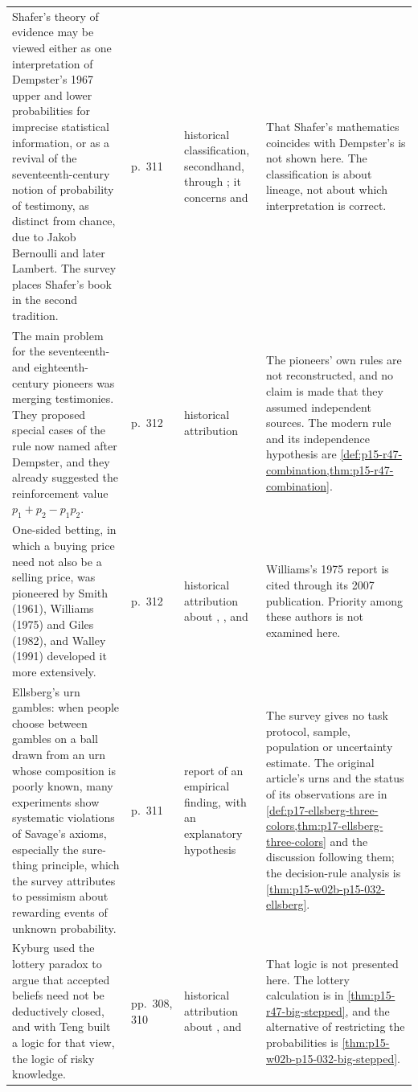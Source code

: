 \begin{longtable}{@{}p{.25\linewidth}p{.08\linewidth}p{.19\linewidth}p{.38\linewidth}@{}}
Shafer's theory of evidence may be viewed either as one interpretation of
Dempster's 1967 upper and lower probabilities for imprecise statistical
information, or as a revival of the seventeenth-century notion of
probability of testimony, as distinct from chance, due to Jakob Bernoulli
and later Lambert. The survey places Shafer's book in the second tradition.
& p.~311 & historical classification, secondhand, through
\cite{R47Shafer1978}; it concerns \cite{R47Dempster1967} and
\cite{R47Shafer1976} &
That Shafer's mathematics coincides with Dempster's is not shown here. The
classification is about lineage, not about which interpretation is correct. \\
The main problem for the seventeenth- and eighteenth-century pioneers was
merging testimonies. They proposed special cases of the rule now named
after Dempster, and they already suggested the reinforcement value
\(p_1+p_2-p_1p_2\). & p.~312 & historical attribution & The pioneers' own
rules are not reconstructed, and no claim is made that they assumed
independent sources. The modern rule and its independence hypothesis are
\cref{def:p15-r47-combination,thm:p15-r47-combination}. \\
One-sided betting, in which a buying price need not also be a selling
price, was pioneered by Smith (1961), Williams (1975) and Giles (1982), and
Walley (1991) developed it more extensively. & p.~312 & historical attribution
about \cite{R47Smith1961}, \cite{R47Williams2007}, \cite{R47Giles1982} and
\cite{R47Walley1991} & Williams's 1975 report is cited through its 2007
publication. Priority among these authors is not examined here. \\
Ellsberg's urn gambles: when people choose between gambles on a ball drawn
from an urn whose composition is poorly known, many experiments show
systematic violations of Savage's axioms, especially the sure-thing
principle, which the survey attributes to pessimism about rewarding
events of unknown probability. & p.~311 & report of an empirical
finding, with an explanatory hypothesis & The survey gives no task protocol,
sample, population or uncertainty estimate. The original article's urns and
the status of its observations are in
\cref{def:p17-ellsberg-three-colors,thm:p17-ellsberg-three-colors}
and the discussion following them; the decision-rule analysis is
\cref{thm:p15-w02b-p15-032-ellsberg}. \\
Kyburg used the lottery paradox to argue that accepted beliefs need not
be deductively closed, and with Teng built a logic for that view, the
logic of risky knowledge. & pp.~308, 310 & historical attribution about
\cite{R47Kyburg1961}, \cite{R47Kyburg1997} and \cite{R47KyburgTeng2012} &
That logic is not presented here. The lottery calculation is in
\cref{thm:p15-r47-big-stepped}, and the alternative of restricting the
probabilities is \cref{thm:p15-w02b-p15-032-big-stepped}. \\
\bottomrule\end{longtable}

